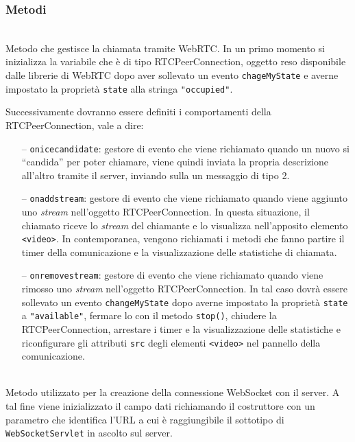 \subsubsection*{Metodi}
\begin{description}

  \item{}\\
  Metodo che gestisce la chiamata tramite WebRTC\@. In un primo momento si inizializza la variabile  che è di tipo RTCPeerConnection, oggetto reso disponibile dalle librerie di WebRTC dopo aver sollevato un evento \verb'chageMyState' e averne impostato la proprietà \verb'state' alla stringa \verb'"occupied"'.
  
  Successivamente dovranno essere definiti i comportamenti della RTCPeerConnection, vale a dire:
  \begin{itemize}
    \item[--] \texttt{onicecandidate}: gestore di evento che viene richiamato quando un nuovo  si ``candida'' per poter chiamare, viene quindi inviata la propria descrizione all'altro  tramite il server, inviando sulla  un messaggio di tipo 2.
    
    \item[--] \texttt{onaddstream}: gestore di evento che viene richiamato quando viene aggiunto uno \textit{stream} nell'oggetto RTCPeerConnection. In questa situazione, il chiamato riceve lo \textit{stream} del chiamante e lo visualizza nell'apposito elemento \verb'<video>'. In contemporanea, vengono richiamati i metodi che fanno partire il timer della comunicazione e la visualizzazione delle statistiche di chiamata.
    
    \item[--] \texttt{onremovestream}: gestore di evento che viene richiamato quando viene rimosso uno \textit{stream} nell'oggetto RTCPeerConnection. In tal caso dovrà essere sollevato un evento \verb'changeMyState' dopo averne impostato la proprietà \verb'state' a \verb'"available"', fermare lo  con il metodo \verb'stop()', chiudere la RTCPeerConnection, arrestare i timer e la visualizzazione delle statistiche e riconfigurare gli attributi \verb'src' degli elementi \verb'<video>' nel pannello della comunicazione.
  \end{itemize}

  \item{}\\
  Metodo utilizzato per la creazione della connessione WebSocket con il server. A tal fine viene inizializzato il campo dati  richiamando il costruttore con un parametro che identifica l'URL a cui è raggiungibile il sottotipo di \verb'WebSocketServlet' in ascolto sul server.
  

\end{description}
